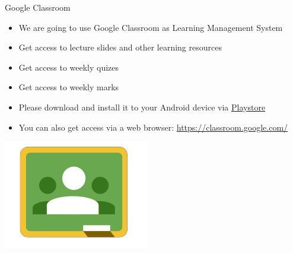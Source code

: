 \documentclass[ignorenonframetext,]{beamer}
\providecommand{\tightlist}{%
  \setlength{\itemsep}{0pt}\setlength{\parskip}{0pt}}
\begin{document}
\begin{frame}{Google Classroom}
\protect\hypertarget{google-classroom}{}

\begin{itemize}
\tightlist
\item
  We are going to use Google Classroom as Learning Management System
\item
  Get access to lecture slides and other learning resources
\item
  Get access to weekly quizes
\item
  Get access to weekly marks
\item
  Please download and install it to your Android device via
  \href{https://play.google.com/store/apps/details?id=com.google.android.apps.classroom}{Playstore}
\item
  You can also get access via a web browser:
  \url{https://classroom.google.com/}
\end{itemize}

\includegraphics{./Introduction-figure/Google-Classroom-Logo.png}

\end{frame}
\end{document}
